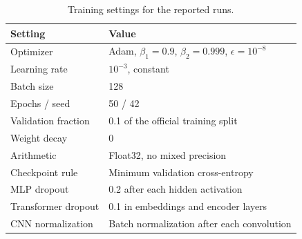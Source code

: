 \begin{table}[htbp]
\centering\small
\caption{Training settings for the reported runs.}
\label{tab:training-setup}
\begin{tabular}{ll}
\toprule
Setting & Value\\
\midrule
Optimizer & Adam, $\beta_1=0.9$, $\beta_2=0.999$, $\epsilon=10^{-8}$\\
Learning rate & $10^{-3}$, constant\\
Batch size & 128\\
Epochs / seed & 50 / 42\\
Validation fraction & 0.1 of the official training split\\
Weight decay & 0\\
Arithmetic & Float32, no mixed precision\\
Checkpoint rule & Minimum validation cross-entropy\\
MLP dropout & 0.2 after each hidden activation\\
Transformer dropout & 0.1 in embeddings and encoder layers\\
CNN normalization & Batch normalization after each convolution\\
\bottomrule
\end{tabular}
\end{table}

